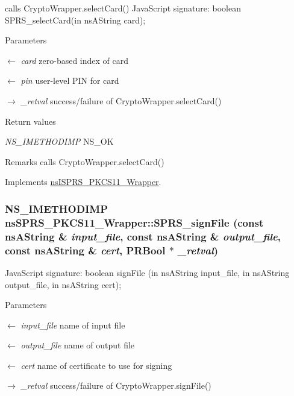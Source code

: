 calls CryptoWrapper.selectCard() JavaScript signature: boolean SPRS\_\-selectCard(in nsAString card);


\begin{DoxyParams}{Parameters}
\item[\mbox{$\leftarrow$} {\em card}]zero-\/based index of card \item[\mbox{$\leftarrow$} {\em pin}]user-\/level PIN for card \item[\mbox{$\rightarrow$} {\em \_\-retval}]success/failure of CryptoWrapper.selectCard() \end{DoxyParams}

\begin{DoxyRetVals}{Return values}
\item[{\em NS\_\-IMETHODIMP}]NS\_\-OK \end{DoxyRetVals}
\begin{DoxyRemark}{Remarks}
calls CryptoWrapper.selectCard() 
\end{DoxyRemark}


Implements \hyperlink{classnsISPRS__PKCS11__Wrapper}{nsISPRS\_\-PKCS11\_\-Wrapper}.\hypertarget{classnsSPRS__PKCS11__Wrapper_a31b12e2b457256fe858eff70590e6c83}{
\subsubsection[{SPRS\_\-signFile}]{\setlength{\rightskip}{0pt plus 5cm}NS\_\-IMETHODIMP nsSPRS\_\-PKCS11\_\-Wrapper::SPRS\_\-signFile (const nsAString \& {\em input\_\-file}, \/  const nsAString \& {\em output\_\-file}, \/  const nsAString \& {\em cert}, \/  PRBool $\ast$ {\em \_\-retval})}}
\label{classnsSPRS__PKCS11__Wrapper_a31b12e2b457256fe858eff70590e6c83}
JavaScript signature: boolean signFile (in nsAString input\_\-file, in nsAString output\_\-file, in nsAString cert); 
\begin{DoxyParams}{Parameters}
\item[\mbox{$\leftarrow$} {\em input\_\-file}]name of input file \item[\mbox{$\leftarrow$} {\em output\_\-file}]name of output file \item[\mbox{$\leftarrow$} {\em cert}]name of certificate to use for signing \item[\mbox{$\rightarrow$} {\em \_\-retval}]success/failure of CryptoWrapper.signFile() \end{DoxyParams}


